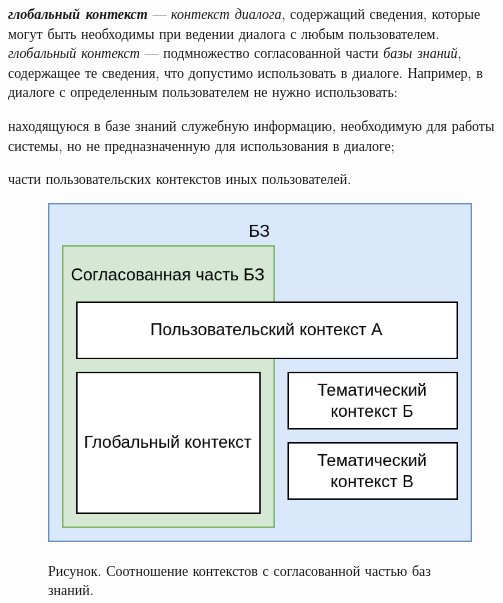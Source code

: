 \textbf{\textit{глобальный контекст}} --- \textit{контекст диалога}, содержащий сведения, которые могут быть необходимы при ведении диалога с любым пользователем.
    \textit{глобальный контекст} --- подмножество согласованной части \textit{базы знаний}, содержащее те сведения, что допустимо использовать в диалоге.
Например, в диалоге с определенным пользователем не нужно использовать:
\begin{textitemize}
    \item находящуюся в базе знаний служебную информацию, необходимую для работы системы, но не предназначенную для использования в диалоге;
    \item части пользовательских контекстов иных пользователей.
\end{textitemize}

\begin{figure}[H]
    \caption{Рисунок. Соотношение контекстов с согласованной частью баз знаний.}
    \includegraphics[scale=0.3]{images/part4/chapter_nl_interfaces/context_in_KB}
    \label{fig:context_in_KB}
\end{figure}

\begin{SCn}

    \begin{scnindent}
        \begin{scneqtoset}
        \end{scneqtoset}
    \end{scnindent}

\end{SCn}

